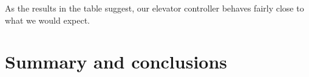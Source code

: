 \documentclass[a4paper]{article}
\begin{document}
As the results in the table suggest, our elevator controller behaves fairly
close to what we would expect.

\section{Summary and conclusions}
\end{document}
